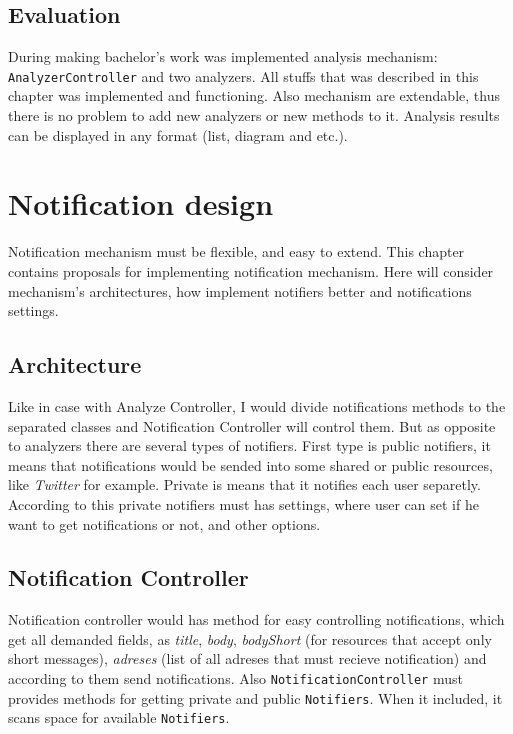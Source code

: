 \section{Evaluation}

During making bachelor's work was implemented analysis mechanism: \texttt{AnalyzerController} and two analyzers. All stuffs that was described in this chapter was implemented and functioning. Also mechanism are extendable, thus there is no problem to add new analyzers or new methods to it. Analysis results can be displayed in any format (list, diagram and etc.).

\chapter{Notification design}
\label{ch:notification_proposal}

Notification mechanism must be flexible, and easy to extend. This chapter contains proposals for implementing notification mechanism. Here will consider mechanism's architectures, how implement notifiers better and notifications settings. 

\section{Architecture}

Like in case with Analyze Controller, I would divide notifications methods to the separated classes and Notification Controller will control them. But as opposite to analyzers there are several types of notifiers. First type is public notifiers, it means that notifications would be sended into some shared or public resources, like \emph{Twitter} for example. Private is means that it notifies each user separetly. According to this private notifiers must has settings, where user can set if he want to get notifications or not, and other options.

\section{Notification Controller}

Notification controller would has method for easy controlling notifications, which get all demanded fields, as \emph{title}, \emph{body}, \emph{bodyShort} (for resources that accept only short messages), \emph{adreses} (list of all adreses that must recieve notification) and according to them send notifications. Also \texttt{NotificationController} must provides methods for getting private and public \texttt{Notifiers}. When it included, it scans space for available \texttt{Notifiers}.

